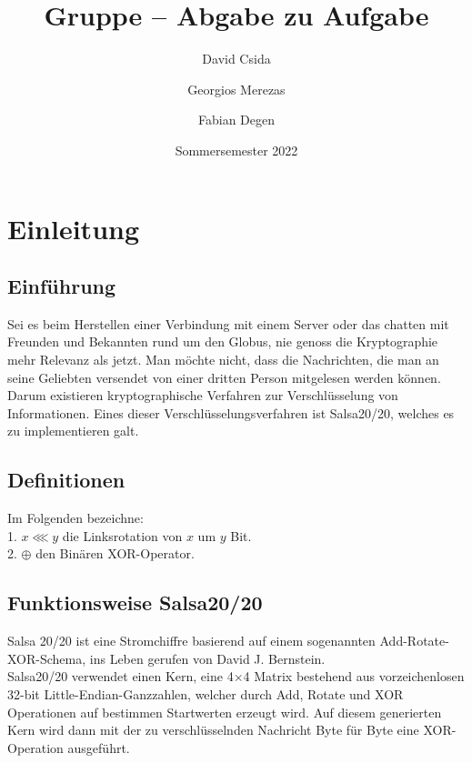 \documentclass[course=erap]{aspdoc}
\author{David Csida \and Georgios Merezas \and Fabian Degen}
\date{Sommersemester 2022} %
\title{Gruppe \theGroup{} -- Abgabe zu Aufgabe \theNumber}
\begin{document}
\maketitle

\section{Einleitung}
\subsection{Einführung}
Sei es beim Herstellen einer Verbindung mit einem Server oder das chatten mit Freunden und Bekannten rund um den Globus, nie genoss die Kryptographie mehr Relevanz als jetzt.
Man möchte nicht, dass die Nachrichten, die man an seine Geliebten versendet von einer dritten Person mitgelesen werden können. Darum existieren kryptographische Verfahren zur Verschlüsselung von Informationen.
Eines dieser Verschlüsselungsverfahren ist Salsa20/20, welches es zu implementieren galt.

\subsection{Definitionen}
Im Folgenden bezeichne: 
\\ \hspace*{5mm} 1. $x \lll y$ die Linksrotation von $x$ um $y$ Bit. 
\\ \hspace*{5mm} 2. $\oplus$ den Binären XOR-Operator.

\subsection{Funktionsweise Salsa20/20}
Salsa 20/20 ist eine Stromchiffre basierend auf einem sogenannten Add-Rotate-XOR-Schema, ins Leben gerufen von David J. Bernstein.
\\Salsa20/20 verwendet einen Kern, eine 4$\times$4 Matrix bestehend aus vorzeichenlosen 32-bit Little-Endian-Ganzzahlen, welcher durch Add, Rotate und XOR Operationen auf bestimmen Startwerten erzeugt wird.
Auf diesem generierten Kern wird dann mit der zu verschlüsselnden Nachricht Byte für Byte eine XOR-Operation ausgeführt.
\cite{intel2017man}
\end{document}
